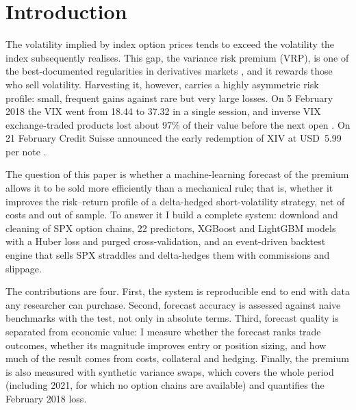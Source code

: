 \documentclass[11pt,a4paper]{article}
\begin{document}
\section{Introduction}\label{sec:intro}

The volatility implied by index option prices tends to exceed the volatility the index subsequently realises. This gap, the variance risk premium (VRP), is one of the best-documented regularities in derivatives markets \citep{carrwu2009}, and it rewards those who sell volatility. Harvesting it, however, carries a highly asymmetric risk profile: small, frequent gains against rare but very large losses. On 5 February 2018 the VIX went from 18.44 to 37.32 in a single session, and inverse VIX exchange-traded products lost about 97\% of their value before the next open \citep{augustin2021}. On 21 February Credit Suisse announced the early redemption of XIV at USD~5.99 per note \citep{varadarajan2023}.

The question of this paper is whether a machine-learning forecast of the premium allows it to be sold more efficiently than a mechanical rule; that is, whether it improves the risk--return profile of a delta-hedged short-volatility strategy, net of costs and out of sample. To answer it I build a complete system: download and cleaning of SPX option chains, 22 predictors, XGBoost and LightGBM models with a Huber loss and purged cross-validation, and an event-driven backtest engine that sells SPX straddles and delta-hedges them with commissions and slippage.

The contributions are four. First, the system is reproducible end to end with data any researcher can purchase. Second, forecast accuracy is assessed against naive benchmarks with the \citet{dieboldmariano1995} test, not only in absolute terms. Third, forecast quality is separated from economic value: I measure whether the forecast ranks trade outcomes, whether its magnitude improves entry or position sizing, and how much of the result comes from costs, collateral and hedging. Finally, the premium is also measured with synthetic variance swaps, which covers the whole period (including 2021, for which no option chains are available) and quantifies the February 2018 loss.
\end{document}
